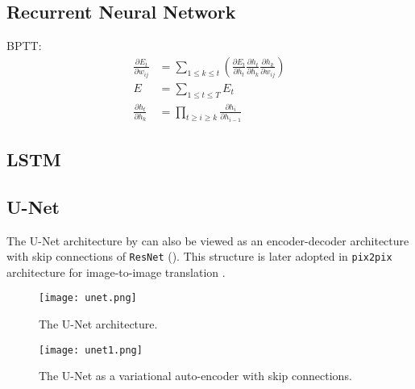 \subsection{Recurrent Neural Network}
\ac{BPTT}:\\
\begin{align}
	\frac{\partial E_t}{\partial w_{ij}} &= \sum_{1 \leq k \leq t} \left( \frac{\partial E_t}{\partial h_t} \frac{\partial h_t}{\partial h_k} \frac{\partial h_k}{\partial w_{ij}} \right)\\
	E &= \sum_{1 \leq t \leq T} E_t\\
	\frac{\partial h_t}{\partial h_k} &= \prod_{t \geq i \geq k} \frac{\partial h_i}{\partial h_{i-1}}
\end{align}
\subsection{LSTM}
\todo{}

\subsection{U-Net}
The U-Net architecture by  can also be viewed as an encoder-decoder architecture \cite{kingma2013auto} with skip connections of \texttt{ResNet} (). This structure is later adopted in \texttt{pix2pix} architecture for image-to-image translation \cite{isola2017image}.
\begin{figure}[hbt!]
	\centering
	\texttt{[image: unet.png]}
	\caption{The U-Net architecture. \cite{ronneberger2015u}}
\end{figure}
\begin{figure}[hbt!]
	\centering
	\texttt{[image: unet1.png]}
	\caption{The U-Net as a variational auto-encoder with skip connections. \cite{isola2017image}}
	\label{fig:unet1}
\end{figure}


